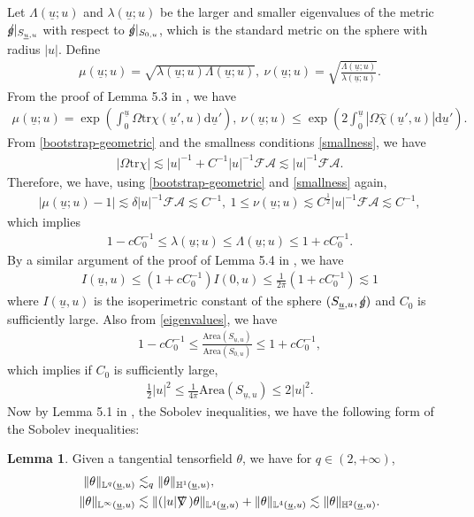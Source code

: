 \documentclass[11pt,reqno]{amsart}
\theoremstyle{definition}
\newtheorem{lemma}{Lemma}[section]
\numberwithin{equation}{section}
\newcommand{\D}{\mathrm{d}}
\newcommand{\tr}{\mathrm{tr}}
\renewcommand{\L}{\mathbb{L}}
\renewcommand{\H}{\mathbb{H}}
\def\chih{\widehat{\chi}}
\def\tr{\mathrm{tr}}
\def\ub{\underline{u}}
\def\nablas{\mbox{$\nabla \mkern -13mu /$ }}
\def\gs{\mbox{$g \mkern -9mu /$}}
\begin{document}
Let $\Lambda(\ub;u)$ and $\lambda(\ub;u)$ be the larger and smaller eigenvalues of the metric $\gs|_{S_{\ub,u}}$ with respect to $\gs|_{S_{0,u}}$, which is the standard metric on the sphere with radius $|u|$. Define
\begin{align*}
\mu(\ub;u)=\sqrt{\lambda(\ub;u)\Lambda(\ub;u)},\ \nu(\ub;u)=\sqrt{\frac{\Lambda(\ub;u)}{\lambda(\ub;u)}}.
\end{align*}
From the proof of Lemma 5.3 in \cite{Chr}, we have
\begin{align*}
\mu(\ub;u)=\exp\left(\int_0^{\ub}\Omega\tr\chi(\ub',u)\D\ub'\right),\ \nu(\ub;u)\le\exp\left(2\int_0^{\ub}|\Omega\chih(\ub',u)|\D\ub'\right).
\end{align*}
From \eqref{bootstrap-geometric} and the smallness conditions \eqref{smallness}, we have 
\begin{align}\label{estimate-Omegatrchi-geometric}|\Omega\tr\chi|\lesssim|u|^{-1}+C^{-1}|u|^{-1}\mathscr{F}\mathcal{A}\lesssim|u|^{-1}\mathscr{F}\mathcal{A}.
\end{align}
 Therefore, we have, using \eqref{bootstrap-geometric} and \eqref{smallness} again, 
\begin{align*}
|\mu(\ub;u)-1|\lesssim\delta|u|^{-1}\mathscr{F}\mathcal{A}\lesssim C^{-1},\ 1\le\nu(\ub;u)\lesssim C^{\frac{1}{2}}|u|^{-1}\mathscr{F}\mathcal{A} \lesssim C^{-1},
\end{align*}
which implies
\begin{align}\label{eigenvalues}
1-cC_0^{-1}\le\lambda(\ub;u)\le\Lambda(\ub;u)\le 1+cC_0^{-1}.
\end{align}
By a similar argument of the proof of Lemma 5.4 in \cite{Chr}, we have
\begin{align}\label{isoperimetric}
I(\ub,u)\le (1+c C_0^{-1}) I(0,u)\le\frac{1}{2\pi}(1+cC_0^{-1})\lesssim 1
\end{align}
where $I(\ub,u)$ is the isoperimetric constant of the sphere $(S_{\ub,u},\gs)$ and $C_0$ is sufficiently large. Also from \eqref{eigenvalues}, we have
\begin{align*}
1-cC_0^{-1}\le\frac{\mathrm{Area}(S_{\ub,u})}{\mathrm{Area}(S_{0,u})}\le 1+cC_0^{-1},
\end{align*}
which implies if $C_0$ is sufficiently large, 
\begin{align}\label{area}
\frac{1}{2}|u|^2\le\frac{1}{4\pi}\mathrm{Area}(S_{\ub,u})\le 2|u|^2.
\end{align}
Now by Lemma 5.1 in \cite{Chr}, the Sobolev inequalities, we have the following form of the Sobolev inequalities:
\begin{lemma}\label{Sobolev}
Given a tangential tensorfield $\theta$, we have for $q\in(2,+\infty)$,
\begin{align*}
\|\theta\|_{\L^q(\ub,u)}&\lesssim_q \|\theta\|_{\H^1(\ub,u)},\\
\|\theta\|_{\L^\infty(\ub,u)}&\lesssim \|(|u|\nablas)\theta\|_{\L^4(\ub,u)}+ \|\theta\|_{\L^4(\ub,u)}\lesssim\|\theta\|_{\H^2(\ub,u)}.
\end{align*}

\end{lemma}
\end{document}
